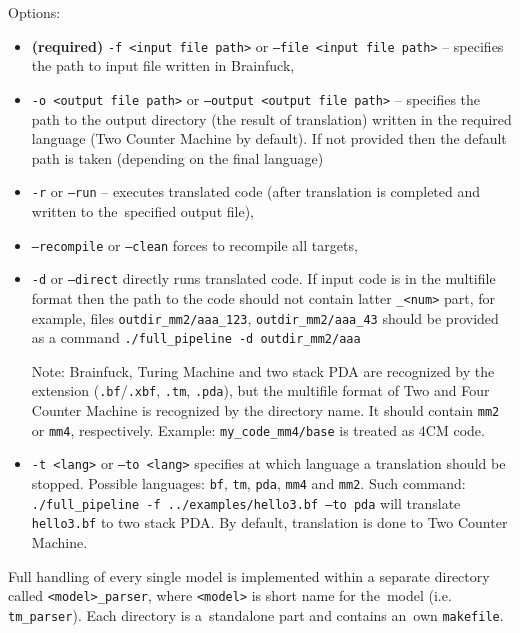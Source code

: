 \documentclass[english,shortabstract,mgr]{iithesis}
\begin{document}
Options:
\begin{itemize}
  \item\textbf{(required)} \texttt{-f <input file path>} or \texttt{--file <input file path>} -- specifies
      the path to input file written in Brainfuck,
  \item \texttt{-o <output file path>} or \texttt{--output <output file path>} -- specifies
      the path to the output directory (the result of translation) written in the required language (Two Counter Machine by default).
      If not provided then the default path is taken (depending on the final language)
  \item \texttt{-r} or \texttt{--run} -- executes translated code (after translation is completed
      and written to the~specified output file),
  \item \texttt{--recompile} or \texttt{--clean} forces to recompile all targets,
  \item \texttt{-d} or \texttt{--direct} directly runs translated code. If input
      code is in the multifile format then the path to the code should not contain latter \texttt{\_<num>}
      part, for example, files \texttt{outdir\_mm2/aaa\_123}, \texttt{outdir\_mm2/aaa\_43} should
      be provided as a command \texttt{./full\_pipeline -d outdir\_mm2/aaa}

      \begin{footnotesize}
      Note: Brainfuck, Turing Machine and two stack PDA are recognized by the extension
      (\texttt{.bf}/\texttt{.xbf}, \texttt{.tm}, \texttt{.pda}), but the multifile format of Two and Four Counter Machine
      is recognized by the directory name. It should contain \texttt{mm2} or
      \texttt{mm4}, respectively. Example: \texttt{my\_code\_mm4/base} is treated as $4$CM code.
      \end{footnotesize}
  \item \texttt{-t <lang>} or \texttt{--to <lang>} specifies at which language a translation should
      be stopped. Possible languages: \texttt{bf}, \texttt{tm}, \texttt{pda}, \texttt{mm4} and \texttt{mm2}.
      Such command: \texttt{./full\_pipeline -f ../examples/hello3.bf --to pda} will translate
      \texttt{hello3.bf} to two stack PDA. By default, translation is done to Two Counter Machine.
\end{itemize}
Full handling of every single model is implemented within a separate directory called
\texttt{<model>\_parser}, where \texttt{<model>} is short name for the~model
(i.e. \texttt{tm\_parser}). Each directory is a~standalone part and contains
an~own \texttt{makefile}.
\end{document}
